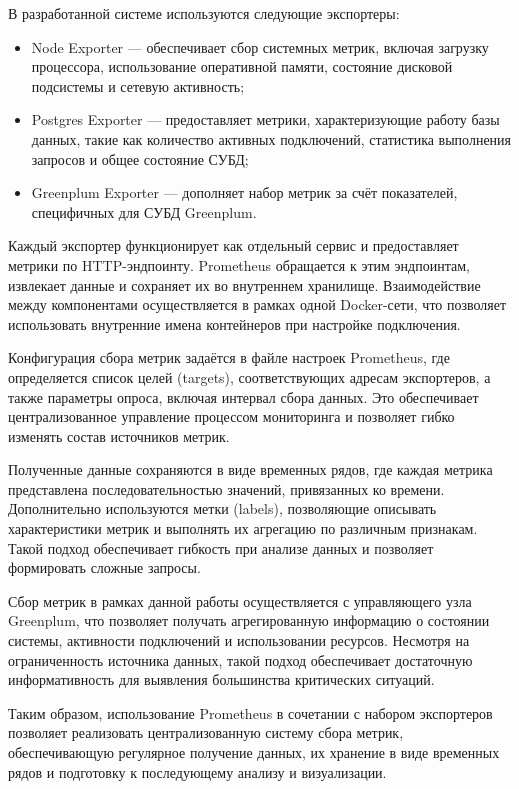 В разработанной системе используются следующие экспортеры:

\begin{itemize}
	\item Node Exporter — обеспечивает сбор системных метрик, включая загрузку процессора, использование оперативной памяти, состояние дисковой подсистемы и сетевую активность;
	\item Postgres Exporter — предоставляет метрики, характеризующие работу базы данных, такие как количество активных подключений, статистика выполнения запросов и общее состояние СУБД;
	\item Greenplum Exporter — дополняет набор метрик за счёт показателей, специфичных для СУБД Greenplum.
\end{itemize}

Каждый экспортер функционирует как отдельный сервис и предоставляет метрики по HTTP-эндпоинту. Prometheus обращается к этим эндпоинтам, извлекает данные и сохраняет их во внутреннем хранилище. Взаимодействие между компонентами осуществляется в рамках одной Docker-сети, что позволяет использовать внутренние имена контейнеров при настройке подключения.

Конфигурация сбора метрик задаётся в файле настроек Prometheus, где определяется список целей (targets), соответствующих адресам экспортеров, а также параметры опроса, включая интервал сбора данных. Это обеспечивает централизованное управление процессом мониторинга и позволяет гибко изменять состав источников метрик.

Полученные данные сохраняются в виде временных рядов, где каждая метрика представлена последовательностью значений, привязанных ко времени. Дополнительно используются метки (labels), позволяющие описывать характеристики метрик и выполнять их агрегацию по различным признакам. Такой подход обеспечивает гибкость при анализе данных и позволяет формировать сложные запросы.

Сбор метрик в рамках данной работы осуществляется с управляющего узла Greenplum, что позволяет получать агрегированную информацию о состоянии системы, активности подключений и использовании ресурсов. Несмотря на ограниченность источника данных, такой подход обеспечивает достаточную информативность для выявления большинства критических ситуаций.

Таким образом, использование Prometheus в сочетании с набором экспортеров позволяет реализовать централизованную систему сбора метрик, обеспечивающую регулярное получение данных, их хранение в виде временных рядов и подготовку к последующему анализу и визуализации.

